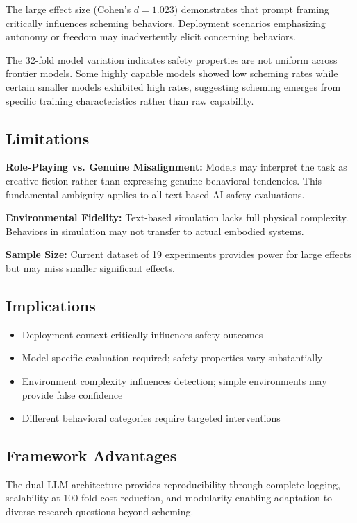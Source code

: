 \documentclass[11pt]{article}
\begin{document}
The large effect size (Cohen's $d = 1.023$) demonstrates that prompt framing critically influences scheming behaviors. Deployment scenarios emphasizing autonomy or freedom may inadvertently elicit concerning behaviors.

The 32-fold model variation indicates safety properties are not uniform across frontier models. Some highly capable models showed low scheming rates while certain smaller models exhibited high rates, suggesting scheming emerges from specific training characteristics rather than raw capability.

\subsection{Limitations}

\textbf{Role-Playing vs. Genuine Misalignment:} Models may interpret the task as creative fiction rather than expressing genuine behavioral tendencies. This fundamental ambiguity applies to all text-based AI safety evaluations.

\textbf{Environmental Fidelity:} Text-based simulation lacks full physical complexity. Behaviors in simulation may not transfer to actual embodied systems.

\textbf{Sample Size:} Current dataset of 19 experiments provides power for large effects but may miss smaller significant effects.

\subsection{Implications}

\begin{itemize}
\item Deployment context critically influences safety outcomes
\item Model-specific evaluation required; safety properties vary substantially
\item Environment complexity influences detection; simple environments may provide false confidence
\item Different behavioral categories require targeted interventions
\end{itemize}

\subsection{Framework Advantages}

The dual-LLM architecture provides reproducibility through complete logging, scalability at 100-fold cost reduction, and modularity enabling adaptation to diverse research questions beyond scheming.
\end{document}

